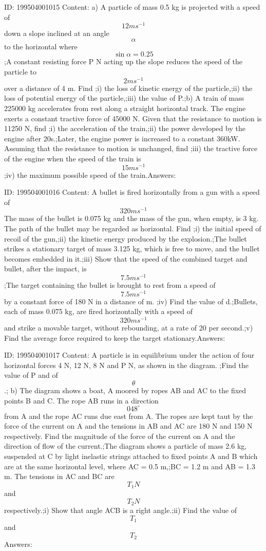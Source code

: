 \documentclass{article}
\begin{document}
ID: 199504001015
Content:
a) A particle of mass 0.5 kg is projected with a speed of  \[12ms^{-1}\]down a slope inclined at an angle \[\alpha\] to the horizontal where \[\sin \alpha=0.25\];A constant resisting force P N acting up the slope reduces the speed of the particle to \[2ms^{-1}\]over a distance of 4 m. Find ;i) the loss of kinetic energy of the particle,;ii) the loss of potential energy of the particle,;iii) the value of P.;b) A train of mass 225000 kg accelerates from rest along a straight horizontal track. The engine exerts a constant tractive force of 45000 N. Given that the resistance to motion is 11250 N, find ;i) the acceleration of the train,;ii) the power developed by the engine after 20s.;Later, the engine power is increased to a constant 360kW. Assuming that the resistance to motion is unchanged, find ;iii) the tractive force of the engine when the speed of the train is \[15ms^{-1}\];iv) the maximum possible speed of the train.Answers:

ID: 199504001016
Content:
A bullet is fired horizontally from a gun with a speed of \[320ms^{-1}\] The mass of the bullet is 0.075 kg and the mass of the gun, when empty, is 3 kg. The path of the bullet may be regarded as horizontal. Find ;i) the initial speed of recoil of the gun,;ii) the kinetic energy produced by the explosion.;The bullet strikes a stationary target of mass 3.125 kg, which is free to move, and the bullet becomes embedded in it.;iii) Show that the speed of the combined target and bullet, after the impact, is \[7.5ms^{-1}\];The target containing the bullet is brought to rest from a speed of \[7.5 ms^{-1}\]by a constant force of 180 N in a distance of m. ;iv) Find the value of d.;Bullets, each of mass 0.075 kg, are fired horizontally with a speed of \[320ms^{-1}\]and strike a movable target, without rebounding, at a rate of 20 per second.;v) Find the average force required to keep the target stationary.Answers:

ID: 199504001017
Content:
A particle is in equilibrium under the action of four horizontal forces 4 N, 12 N, 8 N and P N, as shown in the diagram. ;Find the value of P and of \[\theta\].;    b) The diagram shows a boat, A moored by ropes AB and AC to the fixed points B and C. The rope AB runs in a direction \[048^{\circ}\] from A and the rope AC runs due east from A. The ropes are kept taut by the force of the current on A and the tensions in AB and AC are 180 N and 150 N respectively. Find the magnitude of the force of the current on A and the direction of flow of the current.;The diagram shows a particle of mass 2.6 kg, suspended at C by light inelastic strings attached to fixed points A and B which are at the same horizontal level, where AC = 0.5 m,;BC = 1.2 m and AB = 1.3 m. The tensions in AC and BC are \[T_1N\] and \[T_2N\]respectively.;i) Show that angle ACB is a right angle.;ii) Find the value of \[T_1\]and \[T_2\]Answers:
\end{document}
